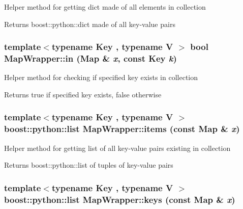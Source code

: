 \label{struct_stl_containers_wrappers_1_1_map_wrapper_ad5e7ad1b461f1693a90fcca938199382}
Helper method for getting dict made of all elements in collection \begin{DoxyReturn}{Returns}
boost::python::dict made of all key-\/value pairs 
\end{DoxyReturn}
\hypertarget{struct_stl_containers_wrappers_1_1_map_wrapper_adb2320f8f6e103e8e260d8893e447922}{
\subsubsection[{in}]{\setlength{\rightskip}{0pt plus 5cm}template$<$typename Key , typename V $>$ bool MapWrapper::in (Map \& {\em x}, \/  const Key {\em k})}}
\label{struct_stl_containers_wrappers_1_1_map_wrapper_adb2320f8f6e103e8e260d8893e447922}
Helper method for checking if specified key exists in collection \begin{DoxyReturn}{Returns}
true if specified key exists, false otherwise 
\end{DoxyReturn}
\hypertarget{struct_stl_containers_wrappers_1_1_map_wrapper_a9aa475b817bbab6bc522b595c7e0a35b}{
\subsubsection[{items}]{\setlength{\rightskip}{0pt plus 5cm}template$<$typename Key , typename V $>$ boost::python::list MapWrapper::items (const Map \& {\em x})}}
\label{struct_stl_containers_wrappers_1_1_map_wrapper_a9aa475b817bbab6bc522b595c7e0a35b}
Helper method for getting list of all key-\/value pairs existing in collection \begin{DoxyReturn}{Returns}
boost::python::list of tuples of key-\/value pairs 
\end{DoxyReturn}
\hypertarget{struct_stl_containers_wrappers_1_1_map_wrapper_ac77b18022558a701e72fef0c590a30e5}{
\subsubsection[{keys}]{\setlength{\rightskip}{0pt plus 5cm}template$<$typename Key , typename V $>$ boost::python::list MapWrapper::keys (const Map \& {\em x})}}
